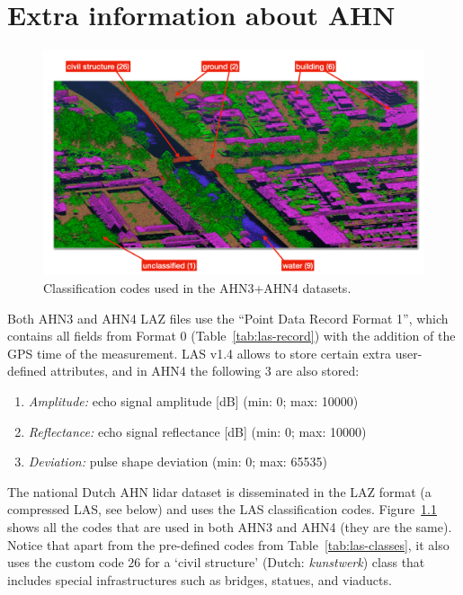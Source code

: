 
\graphicspath{{appendices/ahn/figs/}}

\chapter{Extra information about AHN}%
\label{app:ahn}


\begin{figure}
  \includegraphics[width=\linewidth]{ahn4.png}
  \caption{Classification codes used in the AHN3+AHN4 datasets.}%
\label{fig:ahn3}
\end{figure}

Both AHN3 and AHN4 LAZ files use the ``Point Data Record Format 1'', which contains all fields from Format 0 (Table~\ref{tab:las-record}) with the addition of the GPS time of the measurement.
LAS v1.4 allows to store certain extra user-defined attributes, and in AHN4 the following 3 are also stored:
\begin{enumerate}
  \item \emph{Amplitude:} echo signal amplitude [dB] (min: 0; max: 10000) 
  \item \emph{Reflectance:} echo signal reflectance [dB] (min: 0; max: 10000)
  \item \emph{Deviation:} pulse shape deviation (min: 0; max: 65535)
\end{enumerate}

%


The national Dutch AHN lidar dataset 
is disseminated in the LAZ format (a compressed LAS, see below) and uses the LAS classification codes. 
Figure~\ref{fig:ahn3} shows all the codes that are used in both AHN3 and AHN4 (they are the same). 
Notice that apart from the pre-defined codes from Table~\ref{tab:las-classes}, it also uses the custom code $26$ for a `civil structure' (Dutch: \emph{kunstwerk}) class that includes special infrastructures such as bridges, statues, and viaducts. 

